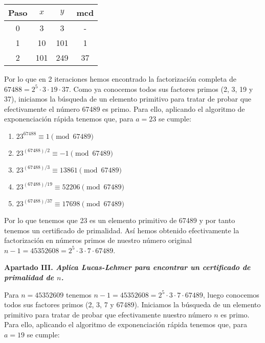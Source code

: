 \documentclass[fleqn]{article}
\begin{document}
    \begin{center}
        \begin{tabular}{| c | c | c | c |}
            \hline Paso & $x$ & $y$ & mcd \\ \hline \hline
            0 & 3 & 3 & - \\ \hline
            1 & 10 & 101 & 1 \\ \hline
            2 & 101 & 249 & 37 \\ \hline 
        \end{tabular}
    \end{center}

    Por lo que en 2 iteraciones hemos encontrado la factorización completa de $67488 = 2^5 \cdot 3 \cdot 19 \cdot 37$. Como ya conocemos
    todos sus factores primos (2, 3, 19 y 37), iniciamos la búsqueda de un elemento primitivo para tratar de probar que efectivamente el número
    67489 es primo. Para ello, aplicando el algoritmo de exponenciación rápida tenemos que, para $a=23$ se cumple:

    \begin{enumerate}
        \item $ 23^{67488} \equiv 1 \pmod{67489}$
        \item $ 23^{(67488)/2} \equiv -1 \pmod{67489}$
        \item $ 23^{(67488)/3} \equiv 13861 \pmod{67489}$
        \item $ 23^{(67488)/19} \equiv 52206 \pmod{67489}$
        \item $ 23^{(67488)/37} \equiv 17698 \pmod{67489}$
    \end{enumerate}

    Por lo que tenemos que 23 es un elemento primitivo de 67489 y por tanto tenemos un certificado de primalidad. Así hemos obtenido efectivamente
    la factorización en números primos de nuestro número original $n-1 = 45352608 = 2^5 \cdot 3 \cdot 7 \cdot 67489$.



    \newpage
    \textbf{Apartado III. \textit{Aplica Lucas-Lehmer para encontrar un certificado de primalidad de $n$.}}

    Para $n = 45352609$ tenemos $n-1 = 45352608 = 2^5 \cdot 3 \cdot 7 \cdot 67489$, luego conocemos todos sus factores primos (2, 3, 7 y 67489).
    Iniciamos la búsqueda de un elemento primitivo para tratar de probar que efectivamente nuestro número $n$ es primo. 
    Para ello, aplicando el algoritmo de exponenciación rápida tenemos que, para $a=19$ se cumple:
\end{document}
